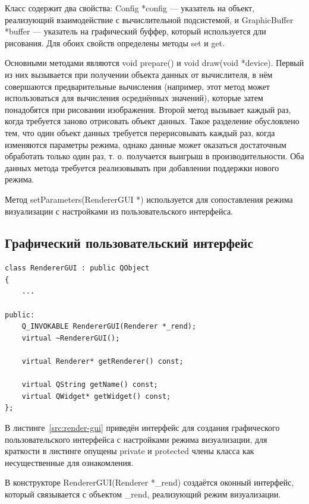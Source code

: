 \documentclass[a4paper,12pt]{extarticle}
\begin{document}
Класс содержит два свойства: \textsf{Config *config} --- указатель на объект, реализующий взаимодействие с вычислительной подсистемой, и \textsf{GraphicBuffer *buffer} --- указатель на графический буффер, который используется дли рисования. Для обоих свойств определены методы \textsf{set} и \textsf{get}.

Основными методами являются \textsf{void prepare()} и \textsf{void draw(void *device)}. Первый из них вызывается при получении объекта данных от вычислителя, в нём совершаются предварительные вычисления (например, этот метод может использоваться для вычисления осреднённых значений), которые затем понадобятся при рисовании изображения. Второй метод вызывает каждый раз, когда требуется заново отрисовать объект данных. Такое разделение обусловлено тем, что один объект данных требуется перерисовывать каждый раз, когда изменяются параметры режима, однако данные может оказаться достаточным обработать только один раз, т. о. получается выигрыш в производительности. Оба данных метода требуется реализовывать при добавлении поддержки нового режима.

Метод \textsf{setParameters(RendererGUI *)} используется для сопоставления режима визуализации с настройками из пользовательского интерфейса.

\subsection{Графический пользовательский интерфейс}

\begin{lstlisting}[label=src:render-gui,caption=Реализация графического интерфейса для настроек режима визуализации]
class RendererGUI : public QObject
{
    ...

public:
    Q_INVOKABLE RendererGUI(Renderer *_rend);
    virtual ~RendererGUI();

    virtual Renderer* getRenderer() const;

    virtual QString getName() const;
    virtual QWidget* getWidget() const;
};
\end{lstlisting}

В листинге~\ref{src:render-gui} приведён интерфейс для создания графического пользовательского интерфейса с настройками режима визуализации, для краткости в листинге опущены \textsf{private} и \textsf{protected} члены класса как несущественные для ознакомления.

В конструкторе \textsf{RendererGUI(Renderer *\_rend)} создаётся оконный интерфейс, который связывается с объектом \textsf{\_rend}, реализующий режим визуализации.
\end{document}
